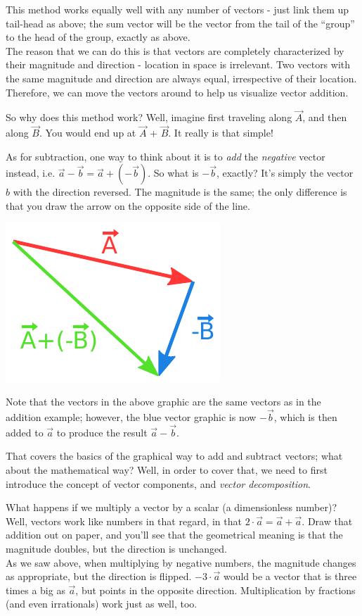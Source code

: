 \documentclass[8.01x]{subfiles}
\begin{document}
This method works equally well with any number of vectors - just link them up tail-head as above; the sum vector will be the vector from the tail of the ``group'' to the head of the group, exactly as above.\\
The reason that we can do this is that vectors are completely characterized by their magnitude and direction - location in space is irrelevant. Two vectors with the same magnitude and direction are always equal, irrespective of their location. Therefore, we can move the vectors around to help us visualize vector addition.

So why does this method work? Well, imagine first traveling along $\vec{A}$, and then along $\vec{B}$. You would end up at $\vec{A}$ + $\vec{B}$. It really is that simple!

As for subtraction, one way to think about it is to \emph{add} the \emph{negative} vector instead, i.e. $\vec{a} - \vec{b} = \vec{a} + (-\vec{b})$. So what is $-\vec{b}$, exactly? It's simply the vector $b$ with the direction reversed. The magnitude is the same; the only difference is that you draw the arrow on the opposite side of the line.

\includegraphics[scale=0.9]{Graphics/vectors/vectorsub}

Note that the vectors in the above graphic are the same vectors as in the addition example; however, the blue vector graphic is now $-\vec{b}$, which is then added to $\vec{a}$ to produce the result $\vec{a} - \vec{b}$.

That covers the basics of the graphical way to add and subtract vectors; what about the mathematical way? Well, in order to cover that, we need to first introduce the concept of vector components, and \emph{vector decomposition}.

What happens if we multiply a vector by a scalar (a dimensionless number)? Well, vectors work like numbers in that regard, in that $2 \cdot \vec{a} = \vec{a} + \vec{a}$. Draw that addition out on paper, and you'll see that the geometrical meaning is that the magnitude doubles, but the direction is unchanged.\\
As we saw above, when multiplying by negative numbers, the magnitude changes as appropriate, but the direction is flipped. $-3 \cdot \vec{a}$ would be a vector that is three times a big as $\vec{a}$, but points in the opposite direction. Multiplication by fractions (and even irrationals) work just as well, too.
\end{document}
